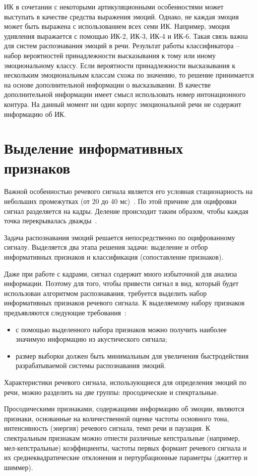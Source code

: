 ИК в сочетании с некоторыми артикуляционными особенностями может выступать в качестве средства выражения эмоций. Однако, не каждая эмоция может быть выражена с использованием всех семи ИК. Например, эмоция удивления выражается с помощью ИК-2, ИК-3, ИК-4 и ИК-6. \cite{conn} Такая связь важна для систем распознавания эмоций в речи. Результат работы классификатора -- набор вероятностей принадлежности высказывания к тому или иному эмоциональному классу. Если вероятности принадлежности высказывания к нескольким эмоциональным классам схожа по значению, то решение принимается на основе дополнительной информации о высказывании. В качестве дополнительной информации имеет смысл использовать номер интонационного контура. На данный момент ни один корпус эмоциональной речи не содержит информацию об ИК.

\section{Выделение информативных признаков}
Важной особенностью речевого сигнала является его условная стационарность на небольших промежутках (от 20 до 40 мс)~\cite{frames}. По этой причине для оцифровки сигнал разделяется на кадры. Деление происходит таким образом, чтобы каждая точка перекрывалась дважды~\cite{mfcc-steps}.

Задача распознавания эмоций решается непосредственно по оцифрованному сигналу. Выделяется два этапа решения задачи: выделение и отбор информативных признаков и классификация (сопоставление признаков).


Даже при работе с кадрами, сигнал содержит много избыточной для анализа информации. Поэтому для того, чтобы привести сигнал в вид, который будет использован алгоритмом распознавания, требуется выделить набор информативных признаков речевого сигнала. К выделяемому набору признаков предъявляются следующие требования~\cite{features-must}: 
\begin{itemize}
	\item с помощью выделенного набора признаков можно получить наиболее значимую информацию из акустического сигнала;
	\item размер выборки должен быть минимальным для увеличения быстродействия разрабатываемой системы распознавания эмоций.
\end{itemize}
Характеристики речевого сигнала, использующиеся для определения эмоций по речи, можно разделить на две группы: просодические и спекртальные. 

Просодическими признаками, содержащими информацию об эмоции, являются признаки, основанные на количественной оценке частоты основного тона, интенсивность (энергия) речевого сигнала, темп речи и паузация. К спектральным признакам можно отнести различные кепстральные (например, мел-кепстральные) коэффициенты, частоты первых формант речевого сигнала и их среднеквадратические отклонения и пертурбационные параметры (джиттер и шиммер).

